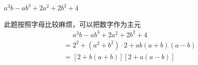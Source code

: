 \documentclass[windows,csize4,answers]{BHCexam}
\begin{document}
\begin{groups}
\begin{questions}[]
        \question[5]$a^3b-ab^3+2a^2+2b^2+4$
        \begin{solution}{0.5cm}
            \methodonly 此题按照字母比较麻烦，可以把数字作为主元
            \[
                \begin{aligned}
                     & \phantom{=}a^3b-ab^3+2a^2+2b^2+4   \\
                     & =2^2+(a^2+b^2)\cdot 2+ab(a+b)(a-b) \\
                     & =[2+b(a+b)][2+a(a-b)]
                \end{aligned}
            \]
        \end{solution}
        \vspace{3.5cm}


    \end{questions}
\end{groups}


\label{lastpage}
\end{document}
